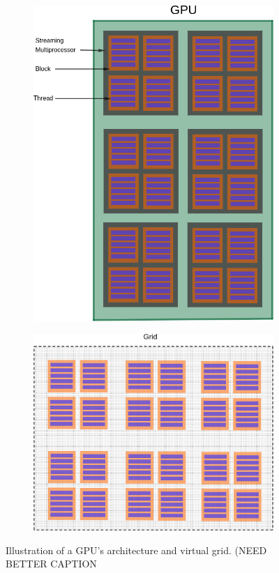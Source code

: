 \begin{figure}
	\centering
	\begin{subfigure}{0.35\linewidth}
		\centering
		\includegraphics[width=\linewidth]{Figures/gpu_arch}
	\end{subfigure} \hfill
	\begin{subfigure}{0.55\linewidth}
		\centering
		\includegraphics[width=0.9\linewidth]{Figures/gpu_grid}
	\end{subfigure}
	\caption{Illustration of a GPU's architecture and virtual grid. (NEED BETTER CAPTION}
	\label{fig:gpu_arch}
\end{figure}
